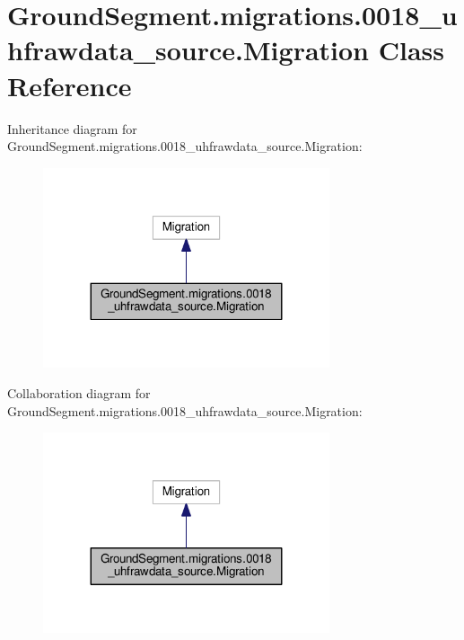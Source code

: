 \hypertarget{class_ground_segment_1_1migrations_1_10018__uhfrawdata__source_1_1_migration}{}\section{Ground\+Segment.\+migrations.0018\+\_\+uhfrawdata\+\_\+source.Migration Class Reference}
\label{class_ground_segment_1_1migrations_1_10018__uhfrawdata__source_1_1_migration}


Inheritance diagram for Ground\+Segment.\+migrations.0018\+\_\+uhfrawdata\+\_\+source.Migration\+:\nopagebreak
\begin{figure}[H]
\begin{center}
\leavevmode
\includegraphics[width=239pt]{class_ground_segment_1_1migrations_1_10018__uhfrawdata__source_1_1_migration__inherit__graph}
\end{center}
\end{figure}


Collaboration diagram for Ground\+Segment.\+migrations.0018\+\_\+uhfrawdata\+\_\+source.Migration\+:\nopagebreak
\begin{figure}[H]
\begin{center}
\leavevmode
\includegraphics[width=239pt]{class_ground_segment_1_1migrations_1_10018__uhfrawdata__source_1_1_migration__coll__graph}
\end{center}
\end{figure}
